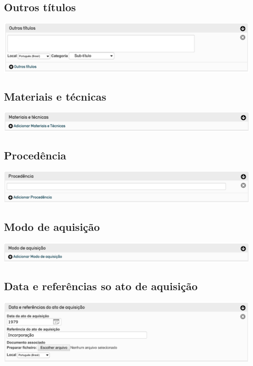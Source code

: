\subsection{Outros títulos}
\begin{flushleft}
	\includegraphics[width=\linewidth]{elemento-06}
\end{flushleft}

\subsection{Materiais e técnicas}
\begin{flushleft}
	\includegraphics[width=\linewidth]{elemento-07}
\end{flushleft}

\subsection{Procedência}
\begin{flushleft}
	\includegraphics[width=\linewidth]{elemento-08}
\end{flushleft}

\subsection{Modo de aquisição}
\begin{flushleft}
	\includegraphics[width=\linewidth]{elemento-09}
\end{flushleft}

\subsection{Data e referências so ato de aquisição}
\begin{flushleft}
	\includegraphics[width=\linewidth]{elemento-10}
\end{flushleft}

